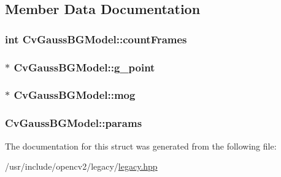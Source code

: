 \subsection{Member Data Documentation}
\hypertarget{structCvGaussBGModel_ac50839a9b69f645df2510c124463bf12}{
\subsubsection[{count\-Frames}]{\setlength{\rightskip}{0pt plus 5cm}int Cv\-Gauss\-B\-G\-Model\-::count\-Frames}}\label{structCvGaussBGModel_ac50839a9b69f645df2510c124463bf12}
\hypertarget{structCvGaussBGModel_ad195ebed0bd02c766fb6c64be83a7e16}{
\subsubsection[{g\-\_\-point}]{$\ast$ Cv\-Gauss\-B\-G\-Model\-::g\-\_\-point}}\label{structCvGaussBGModel_ad195ebed0bd02c766fb6c64be83a7e16}
\hypertarget{structCvGaussBGModel_a5398a6fe47cc99625cb4a33b0abbe0f2}{
\subsubsection[{mog}]{$\ast$ Cv\-Gauss\-B\-G\-Model\-::mog}}\label{structCvGaussBGModel_a5398a6fe47cc99625cb4a33b0abbe0f2}
\hypertarget{structCvGaussBGModel_a4e96ac84bc0a35bfa107a6aae2b8cc32}{
\subsubsection[{params}]{ Cv\-Gauss\-B\-G\-Model\-::params}}\label{structCvGaussBGModel_a4e96ac84bc0a35bfa107a6aae2b8cc32}


The documentation for this struct was generated from the following file\-:\begin{DoxyCompactItemize}
\item 
/usr/include/opencv2/legacy/\hyperlink{legacy_8hpp}{legacy.\-hpp}\end{DoxyCompactItemize}
